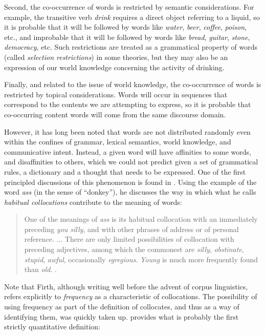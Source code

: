 Second, the co-occurrence of words is restricted by semantic considerations. For example, the transitive verb \textit{drink} requires a direct object referring to a liquid, so it is probable that it will be followed by words like \textit{water}, \textit{beer}, \textit{coffee}, \textit{poison}, etc., and improbable that it will be followed by words like \textit{bread}, \textit{guitar}, \textit{stone}, \textit{democracy}, etc. Such restrictions are treated as a grammatical property of words (called \textit{selection restrictions}) in some theories, but they may also be an expression of our world knowledge concerning the activity of drinking.

Finally, and related to the issue of world knowledge, the co-occurrence of words is restricted by topical considerations. Words will occur in sequences that correspond to the contents we are attempting to express, so it is probable that co-occurring content words will come from the same discourse domain.

However, it has long been noted that words are not distributed randomly even within the confines of grammar, lexical semantics, world knowledge, and communicative intent. Instead, a given word will have affinities to some words, and disaffinities to others, which we could not predict given a set of grammatical rules, a dictionary and a thought that needs to be expressed. One of the first principled discussions of this phenomenon is found in \citet{firth_papers_1957}. Using the example of the word \textit{ass} (in the sense of ``donkey''), he discusses the way in which what he calls \textit{habitual collocations} contribute to the meaning of words:

\begin{quotation}
One of the meanings of \textit{ass} is its habitual collocation with an immediately preceding \textit{you silly}, and with other phrases of address or of personal reference. ... There are only limited possibilities of collocation with preceding adjectives, among which the commonest are \textit{silly}, \textit{obstinate}, \textit{stupid}, \textit{awful}, occasionally \textit{egregious}. \textit{Young} is much more frequently found than \textit{old}. \citep[194f]{firth_papers_1957}.
\end{quotation}

Note that Firth, although writing well before the advent of corpus linguistics, refers explicitly to \textit{frequency} as a characteristic of collocations. The possibility of using frequency as part of the definition of collocates, and thus as a way of identifying them, was quickly taken up. \citet{halliday_categories_1961} provides what is probably the first strictly quantitative definition:

